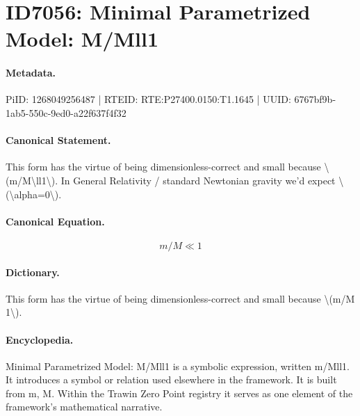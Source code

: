 \section*{ID7056: Minimal Parametrized Model: M/Mll1}
\paragraph{Metadata.}
PiID: 1268049256487 | RTEID: RTE:P27400.0150:T1.1645 | UUID: 6767bf9b-1ab5-550c-9ed0-a22f637f4f32

\paragraph{Canonical Statement.}
This form has the virtue of being dimensionless-correct and small because \textbackslash{}(m/M\textbackslash{}ll1\textbackslash{}). In General Relativity / standard Newtonian gravity we'd expect \textbackslash{}(\textbackslash{}alpha=0\textbackslash{}).

\paragraph{Canonical Equation.}
\[
m/M\ll1
\]

\paragraph{Dictionary.}
This form has the virtue of being dimensionless-correct and small because \textbackslash{}(m/M 1\textbackslash{}).

\paragraph{Encyclopedia.}
Minimal Parametrized Model: M/Mll1 is a symbolic expression, written m/Mll1. It introduces a symbol or relation used elsewhere in the framework. It is built from m, M. Within the Trawin Zero Point registry it serves as one element of the framework's mathematical narrative.
